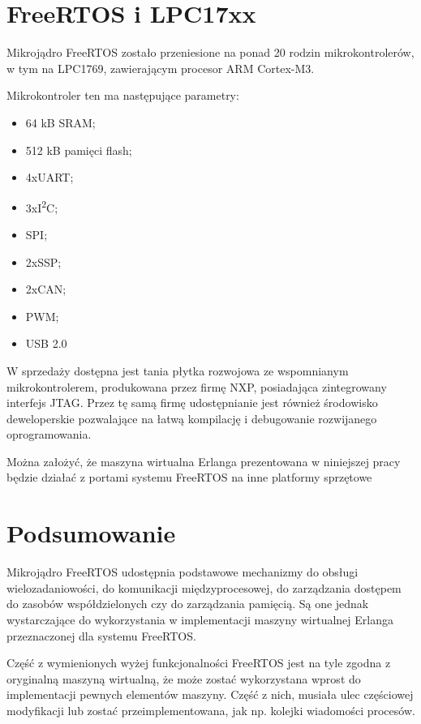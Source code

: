 \section{FreeRTOS i LPC17xx}
\label{sec:rtosLPC}

Mikrojądro FreeRTOS zostało przeniesione na ponad 20 rodzin mikrokontrolerów, w tym na LPC1769, zawierającym procesor ARM Cortex-M3.

Mikrokontroler ten ma następujące parametry:
\begin{itemize}
\item 64 kB SRAM;
\item 512 kB pamięci flash;
\item 4xUART;
\item 3xI\textsuperscript{2}C;
\item SPI;
\item 2xSSP;
\item 2xCAN;
\item PWM;
\item USB 2.0
\end{itemize}

W sprzedaży dostępna jest tania płytka rozwojowa ze wspomnianym mikrokontrolerem, produkowana przez firmę NXP, posiadająca zintegrowany interfejs JTAG. Przez tę samą firmę udostępnianie jest również środowisko deweloperskie pozwalające na łatwą kompilację i debugowanie rozwijanego oprogramowania.

Można założyć, że maszyna wirtualna Erlanga prezentowana w niniejszej pracy będzie działać z portami systemu FreeRTOS na inne platformy sprzętowe

\section{Podsumowanie}
\label{sec:rtosPodsumowanie}

Mikrojądro FreeRTOS udostępnia podstawowe mechanizmy do obsługi wielozadaniowości, do komunikacji międzyprocesowej, do zarządzania dostępem do zasobów współdzielonych czy do zarządzania pamięcią. Są one jednak wystarczające do wykorzystania w implementacji maszyny wirtualnej Erlanga przeznaczonej dla systemu FreeRTOS.

Część z wymienionych wyżej funkcjonalności FreeRTOS jest na tyle zgodna z oryginalną maszyną wirtualną, że może zostać wykorzystana wprost do implementacji pewnych elementów maszyny. Część z nich, musiała ulec częściowej modyfikacji lub zostać przeimplementowana, jak np. kolejki wiadomości procesów. 